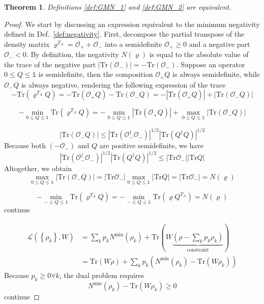 \documentclass[12font]{article}
\numberwithin{equation}{section}    %
\newtheorem{theorem}{Theorem}[section]
\theoremstyle{definition}
\newcommand{\lr}[1]{\left(  #1  \right)}
\newcommand{\lrg}[1]{\left\{  #1  \right\}}
\newcommand{\abs}[1]{\left|  #1  \right|}
\newcommand{\mrm}[1]{\mathrm{#1}}
\newcommand{\alert}[1]{{\color{red}#1}}
\newcommand{\Tr}{\mrm{Tr}}
\begin{document}
\begin{theorem}
    Definitions \ref{def:GMN_1} and \ref{def:GMN_2} are equivalent.
\end{theorem}
\begin{proof}
    We start by discussing an expression equivalent to the minimum negativity defined in Def.~\ref{def:negativity}. First, decompose the partial transpose of the density matrix $\varrho^{T_A} = \mathcal{O}_+ + \mathcal{O}_-$ into a semidefinite $\mathcal{O}_+ \geq 0$ and a negative part $\mathcal{O}_- < 0$. By definition, the negativity $N(\varrho)$ is equal to the absolute value of the trace of the negative part $\abs{\Tr\lr{\mathcal{O}_-}} = -\Tr\lr{\mathcal{O}_-}$. Suppose an operator $0 \leq Q \leq \mathds{1}$ is semidefinite, then the composition $\mathcal{O}_+ Q$ is always semidefinite, while $\mathcal{O}_-Q$ is always negative, rendering the following expression of the trace
    \[
    -\Tr\lr{\varrho^{T_A} Q} 
    = 
    -\Tr\lr{\mathcal{O}_+ Q} 
    - 
    \Tr\lr{\mathcal{O}_- Q}
    =
    -\abs{\Tr\lr{\mathcal{O}_+ Q}}
    +
    \abs{\Tr\lr{\mathcal{O}_- Q}}
    \]

    \[
    - \min_{0\leq Q \leq\mathds{1}} \Tr\lr{\varrho^{T_A} Q}
    =
    - \min_{0\leq Q \leq\mathds{1}} \abs{\Tr\lr{\mathcal{O}_+ Q}}
    +
    \max_{0\leq Q \leq\mathds{1}} \abs{\Tr\lr{\mathcal{O}_- Q}}
    \]

    \[
    \abs{\Tr\lr{\mathcal{O}_- Q}} 
    \leq 
    \abs{\Tr\lr{\mathcal{O}_-^\dagger\mathcal{O}_-}}^{1/2} 
    \abs{\Tr \lr{Q^\dagger Q}}^{1/2}
    \]
    Because both $(-\mathcal{O}_-)$ and $Q$ are positive semidefinite, we have
    \[
    \abs{\Tr\lr{\mathcal{O}_-^\dagger\mathcal{O}_-}}^{1/2}  \abs{\Tr \lr{Q^\dagger Q}}^{1/2}
    \leq
    \abs{\Tr \mathcal{O_-}} \abs{\Tr Q}
    \]
    Altogether, we obtain
    \[
    \max_{0\leq Q \leq\mathds{1}} \abs{\Tr\lr{\mathcal{O}_- Q}}
    =
    \abs{\Tr\mathcal{O}_-} \max_{0\leq Q \leq\mathds{1}} \abs{\Tr Q}
    =
    \abs{\Tr\mathcal{O}_-}
    =
    N(\varrho)
    \]

    \[
    -\min_{-\leq Q\leq\mathds{1}}\Tr\lr{\varrho^{T_A} Q} = -\min_{-\leq Q\leq\mathds{1}}\Tr\lr{\varrho Q^{T_A}} = N(\varrho)
    \]
    \alert{continue}
    
    \begin{align*}
        \mathcal{L}(\lrg{\rho_k}, W) &= \sum_k p_k N^{\min}(\rho_k) + \mrm{Tr}
        \lr{
        W \underbrace{\lr{\rho - \sum_k p_k \rho_k}}_{\text{constraint}} 
        } \\
        &= \mrm{Tr}\lr{W\rho} + \sum_k p_k \lr{N^{\min}(\rho_k) - \mrm{Tr}\lr{W\rho_k}}
    \end{align*}
    Because $p_k\geq 0 \forall k$, the dual problem requires
    \[
    N^{\min}(\rho_k) - \mrm{Tr}\lr{W\rho_k} \geq 0
    \]
    \alert{continue}
\end{proof}
\end{document}
